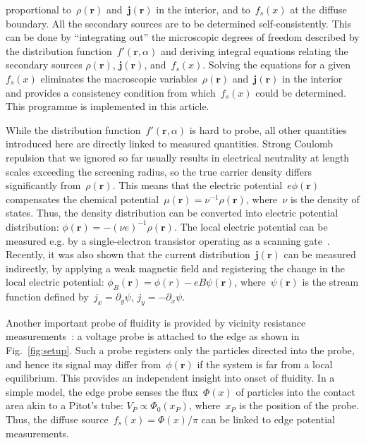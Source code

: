 \documentclass[preprint,aps,eqsecnum]{revtex4-1}
\begin{document}
proportional to~$\rho({\bm r})$ and~${\bm j}({\bm r})$ in the interior,
and to~$f_s(x)$ at the diffuse boundary. All the secondary sources are to
be determined self-consistently. This can be done by ``integrating out''
the microscopic degrees of freedom described by the distribution
function~$f'({\bm r}, \alpha)$
and deriving integral equations relating the secondary sources
$\rho({\bm r})$, ${\bm j}({\bm r})$, and~$f_s(x)$. Solving
the equations for a given~$f_s(x)$ eliminates the macroscopic
variables~$\rho({\bm r})$ and~${\bm j}({\bm r})$ in the interior
and provides a consistency condition from which~$f_s(x)$ could be determined.
This programme is implemented in this article.

While the distribution
function~$f'({\bm r}, \alpha)$ is hard to probe, all other quantities
introduced here are directly linked to measured quantities. 
Strong Coulomb repulsion
that we ignored so far usually  results in electrical neutrality
at length scales exceeding the screening radius, so the true carrier
density differs significantly from~$\rho({\bm r})$. This means that
the electric potential~$e\phi({\bm r})$ compensates the chemical
potential~$\mu({\bm r}) = \nu^{-1} \rho({\bm r})$, where~$\nu$
is the density of states. Thus, the density distribution can be converted
into electric
potential distribution: $\phi({\bm r}) = - (\nu e)^{-1} \rho({\bm r})$.
The local electric potential can be measured e.g. by a single-electron
transistor operating as a scanning gate~\cite{bib:Ilani}. Recently, it was
also shown\cite{bib:Measuring-Psi}
that the current distribution~${\bm j}({\bm r})$
can be measured indirectly, by applying
a weak magnetic field and registering the change in the local electric
potential: $\phi_B({\bm r}) = \phi(r) - eB \psi({\bm r})$,
where~$\psi({\bm r})$ is the stream function defined
by~$j_x = \partial_y \psi$, $j_y= -\partial_x \psi$.

Another important probe of fluidity is provided by
vicinity resistance measurements~\cite{bib:Bandurin, bib:Ensslin}:
a voltage probe is attached to the edge as shown in
Fig.~\ref{fig:setup}. Such a probe
registers only the particles directed into the probe, and hence
its signal may differ from~$\phi({\bm r})$ if the system is far from a
local equilibrium.  This provides an
independent insight into onset of fluidity. In a simple model, the
edge probe senses the flux~$\Phi(x)$ of particles into the contact area
akin to a Pitot's tube:
$V_P \propto \Phi_0(x_P)$, where~$x_P$ is the position of the probe.
Thus, the diffuse source~$f_s(x) = \Phi(x)/\pi$ can be linked to edge
potential measurements. 
\end{document}
